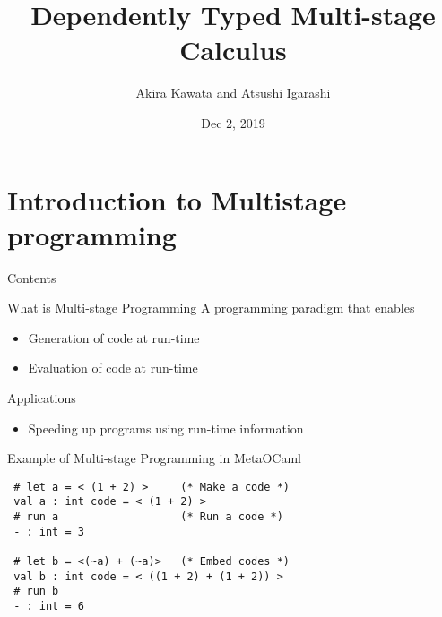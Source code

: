 \documentclass[dvipdfmx,aspectratio=169, 20pt]{beamer}
\title{Dependently Typed Multi-stage Calculus}
\author{\underline{Akira Kawata} and Atsushi Igarashi}
\institute{Graduate School of Informatics, Kyoto University}
\date{Dec 2, 2019}
\begin{document}
\maketitle


\section{Introduction to Multistage programming}

\begin{frame}{Contents}


    \tableofcontents
    \note{
    }
\end{frame}

\begin{frame}[fragile]{What is Multi-stage Programming}
    A programming paradigm that enables
    \begin{itemize}
        \item Generation of code at run-time
        \item Evaluation of code at run-time
    \end{itemize}
    Applications
    \begin{itemize}
        \item Speeding up programs using run-time information
    \end{itemize}
    \note{
    }
\end{frame}

\begin{frame}[fragile]{Example of Multi-stage Programming in MetaOCaml}
    \begin{exampleblock}{}
        \begin{verbatim}
 # let a = < (1 + 2) >     (* Make a code *)
 val a : int code = < (1 + 2) >
 # run a                   (* Run a code *)
 - : int = 3

 # let b = <(~a) + (~a)>   (* Embed codes *)
 val b : int code = < ((1 + 2) + (1 + 2)) >
 # run b
 - : int = 6
        \end{verbatim}
    \end{exampleblock}
    \note{
    }
\end{frame}
\end{document}
